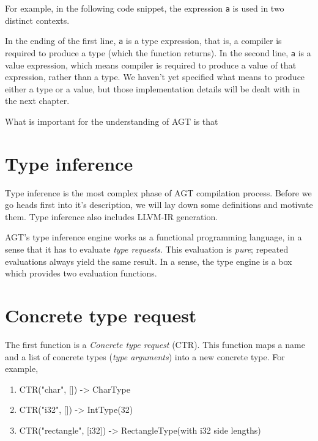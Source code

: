 \documentclass[times, utf8, diplomski]{fer}
\theoremstyle{definition}
\newcommand{\textcode}[3]{
    
}
\begin{document}
For example, in the following code snippet, the expression \texttt{a} is used in two distinct contexts.

\textcode{\resdir/compiler/ast}{}{a}

In the ending of the first line, \texttt{a} is a type expression, that is, a compiler is required to produce
a type (which the function returns). In the second line, \texttt{a} is a value expression,
which means compiler is required to produce a value of that expression, rather than a type.
We haven't yet specified what means to produce either a type or a value, but those implementation
details will be dealt with in the next chapter.

What is important for the understanding of AGT is that 

\textcode{\resdir/compiler/diff.py}{}{a}





\section{Type inference}

Type inference is the most complex phase of AGT compilation process.
Before we go heads first into it's description, we will lay down some definitions
and motivate them. Type inference also includes LLVM-IR generation. 

AGT's type inference engine works as a functional programming language,
in a sense that it has to evaluate \textit{type requests}.
This evaluation is \textit{pure}; repeated evaluations always yield the same result.
In a sense, the type engine is a box which provides two evaluation functions.

\section{Concrete type request}

The first function is a \textit{Concrete type request} (CTR). This function maps
a name and a list of concrete types (\textit{type arguments}) into a new concrete type. For example,

\begin{enumerate}
    \item CTR("char", []) -> CharType
    \item CTR("i32", []) -> IntType(32)
    \item CTR("rectangle", [i32]) -> RectangleType(with i32 side lengths)
\end{enumerate}
\end{document}
